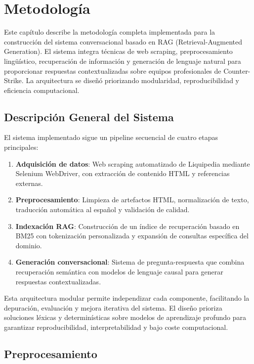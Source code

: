 ﻿\chapter{Metodología}%
\label{ch:metodologia}

Este capítulo describe la metodología completa implementada para la construcción del sistema conversacional basado en RAG (Retrieval-Augmented Generation). El sistema integra técnicas de web scraping, preprocesamiento lingüístico, recuperación de información y generación de lenguaje natural para proporcionar respuestas contextualizadas sobre equipos profesionales de Counter-Strike. La arquitectura se diseñó priorizando modularidad, reproducibilidad y eficiencia computacional.

\section{Descripción General del Sistema}

El sistema implementado sigue un pipeline secuencial de cuatro etapas principales:

\begin{enumerate}
    \item \textbf{Adquisición de datos}: Web scraping automatizado de Liquipedia mediante Selenium WebDriver, con extracción de contenido HTML y referencias externas.
    \item \textbf{Preprocesamiento}: Limpieza de artefactos HTML, normalización de texto, traducción automática al español y validación de calidad.
    \item \textbf{Indexación RAG}: Construcción de un índice de recuperación basado en BM25 con tokenización personalizada y expansión de consultas específica del dominio.
    \item \textbf{Generación conversacional}: Sistema de pregunta-respuesta que combina recuperación semántica con modelos de lenguaje causal para generar respuestas contextualizadas.
\end{enumerate}

Esta arquitectura modular permite independizar cada componente, facilitando la depuración, evaluación y mejora iterativa del sistema. El diseño prioriza soluciones léxicas y determinísticas sobre modelos de aprendizaje profundo para garantizar reproducibilidad, interpretabilidad y bajo coste computacional.

\section{Preprocesamiento}%
\label{sec:preprocesamiento}

